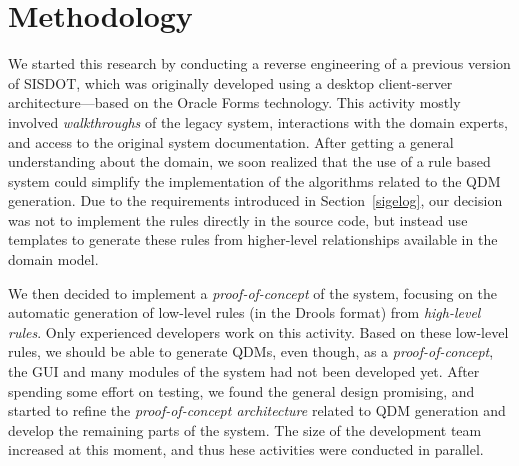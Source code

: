 \documentclass[AMA,STIX1COL,hidelinks]{WileyNJD-v2}
\newcommand{\callers}{\emph{high-level rules}\xspace}
\begin{document}





\section{Methodology}\label{sec:Methodology}

We started this research by conducting a
reverse engineering of a previous version of
SISDOT, which was originally developed
using a desktop client-server architecture---based on the Oracle Forms technology.
This activity
mostly involved \emph{walkthroughs} of
the legacy system, interactions with the
domain experts, and access to the original
system documentation. After getting a
general understanding about the domain, we soon
realized that the use of a rule based system
could simplify the implementation of the
algorithms related to the QDM generation. Due to the
requirements introduced in Section~\ref{sigelog}, our
decision was not to implement the rules directly
in the source code, but instead use templates
to generate these rules from higher-level
relationships available in the domain model.

We then decided to implement a
\emph{proof-of-concept} of the system,
focusing on the automatic generation of
low-level rules (in the Drools format)
from \callers. Only experienced developers
work on this activity. Based on these low-level
rules, we should be able to generate
QDMs, even though, as a \emph{proof-of-concept},
the GUI and many modules of the
system had not been developed yet. After
spending some effort on testing, we found
the general design promising, and started
to refine the \emph{proof-of-concept architecture}
related to QDM generation and
develop the remaining parts of the system. The size
of the development team increased at this moment, and
thus hese activities were conducted in parallel. 
\end{document}
